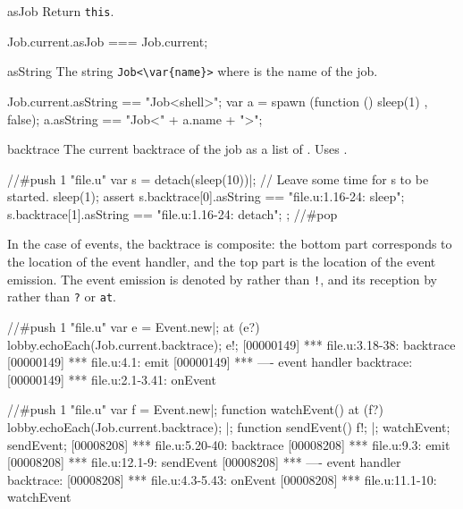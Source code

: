 \begin{urbiscriptapi}
\item[asJob]
  Return \lstinline|this|.
\begin{urbiassert}
Job.current.asJob === Job.current;
\end{urbiassert}


\item[asString] The string \lstinline|Job<\var{name}>| where  is
  the name of the job.
\begin{urbiassert}
Job.current.asString == "Job<shell>";
var a = spawn (function () { sleep(1) }, false);
a.asString == "Job<" + a.name + ">";
\end{urbiassert}

\item[backtrace] The current backtrace of the job as a list of
  .  Uses .

\begin{urbiscript}
//#push 1 "file.u"
var s = detach(sleep(10))|;
// Leave some time for s to be started.
sleep(1);
assert
{
  s.backtrace[0].asString == "file.u:1.16-24: sleep";
  s.backtrace[1].asString == "file.u:1.16-24: detach";
};
//#pop
\end{urbiscript}

  In the case of events, the backtrace is composite: the bottom part
  corresponds to the location of the event handler, and the top part is the
  location of the event emission.  The event emission is denoted by
   rather than \lstinline|!|, and its reception by
   rather than \lstinline|?| or \lstinline|at|.

\begin{urbiscript}
//#push 1 "file.u"
var e = Event.new|;
at (e?)
  lobby.echoEach(Job.current.backtrace);
e!;
[00000149] *** file.u:3.18-38: backtrace
[00000149] *** file.u:4.1: emit
[00000149] *** ---- event handler backtrace:
[00000149] *** file.u:2.1-3.41: onEvent

//#push 1 "file.u"
var f = Event.new|;
function watchEvent()
{
  at (f?)
    lobby.echoEach(Job.current.backtrace);
}|;
function sendEvent()
{
  f!;
}|;
watchEvent;
sendEvent;
[00008208] *** file.u:5.20-40: backtrace
[00008208] *** file.u:9.3: emit
[00008208] *** file.u:12.1-9: sendEvent
[00008208] *** ---- event handler backtrace:
[00008208] *** file.u:4.3-5.43: onEvent
[00008208] *** file.u:11.1-10: watchEvent
\end{urbiscript}


\end{urbiscriptapi}
